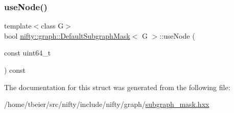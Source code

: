 \mbox{\label{structnifty_1_1graph_1_1DefaultSubgraphMask_a2feccc1074a9af42321314a545f57c2e}} 
\subsubsection{\texorpdfstring{use\+Node()}{useNode()}}
{\footnotesize\ttfamily template$<$class G$>$ \\
bool \hyperlink{structnifty_1_1graph_1_1DefaultSubgraphMask}{nifty\+::graph\+::\+Default\+Subgraph\+Mask}$<$ G $>$\+::use\+Node (\begin{DoxyParamCaption}\item[{const uint64\+\_\+t}]{ }\end{DoxyParamCaption}) const\hspace{0.3cm}{\ttfamily [inline]}}



The documentation for this struct was generated from the following file\+:\begin{DoxyCompactItemize}
\item 
/home/tbeier/src/nifty/include/nifty/graph/\hyperlink{subgraph__mask_8hxx}{subgraph\+\_\+mask.\+hxx}\end{DoxyCompactItemize}
